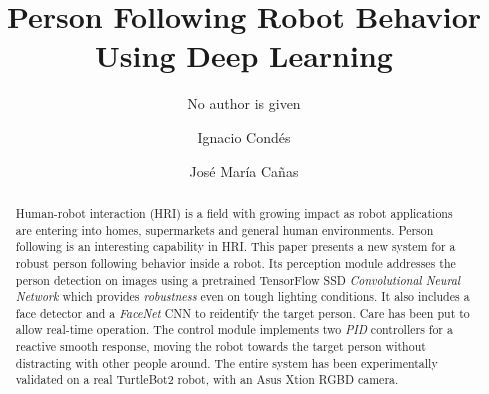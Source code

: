 \documentclass{svproc}
\begin{document}
\mainmatter              %
%
\title{Person Following Robot Behavior Using Deep Learning}
%
%
\author{No author is given}
\author{Ignacio Condés \and José María Cañas}

\maketitle              %

\begin{abstract}
Human-robot interaction (HRI) is a field with growing impact as robot applications are entering into homes, supermarkets and general human environments. Person following is an interesting capability in HRI. This paper presents a new system for a robust person following behavior inside a robot. Its perception module addresses the person detection on images using a pretrained TensorFlow SSD \emph{Convolutional Neural Network} which provides \emph{robustness} even on tough lighting conditions. It also includes a face detector and a \emph{FaceNet} CNN to reidentify the target person. Care has been put to allow real-time operation. 
The control module implements two \emph{PID} controllers for a reactive smooth response, moving the robot towards the target person without distracting with other people around. The entire system has been experimentally validated on a real TurtleBot2 robot, with an Asus Xtion RGBD camera.
\end{abstract}
%






\end{document}
